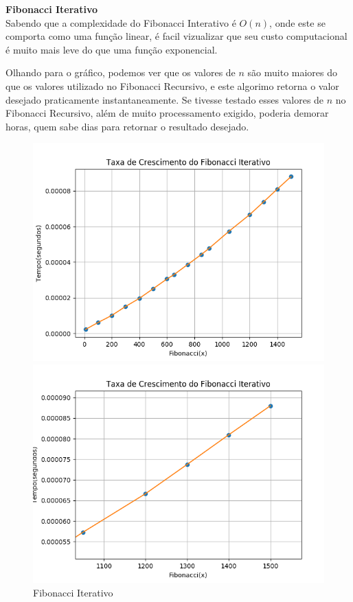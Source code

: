 \documentclass[a4paper, 12pt]{article}
\begin{document}
{\Large\bf Fibonacci Iterativo}\\

Sabendo que a complexidade do Fibonacci Interativo é $O(n)$, onde este se comporta como uma função linear, é facil vizualizar que seu custo computacional é muito mais leve do que uma função exponencial. 

Olhando para o gráfico, podemos ver que os valores de $n$ são muito maiores do que os valores utilizado no Fibonacci Recursivo, e este algorimo retorna o valor desejado praticamente instantaneamente. Se tivesse testado esses valores de $n$ no Fibonacci Recursivo, além de muito processamento exigido, poderia demorar horas, quem sabe dias para retornar o resultado desejado.


\begin{figure}[h]
\centering
\begin{minipage}[b]{0.45\linewidth}
\includegraphics[width=\linewidth]{../fibonacci_iterativo.png}
\caption{Fibonacci Iterativo}
\end{minipage}
\hfill
\begin{minipage}[b]{0.45\linewidth}
\includegraphics[width=\linewidth]{../fibonacci_iterativo_zoom.png}

\end{minipage}
\end{figure}
\end{document}
